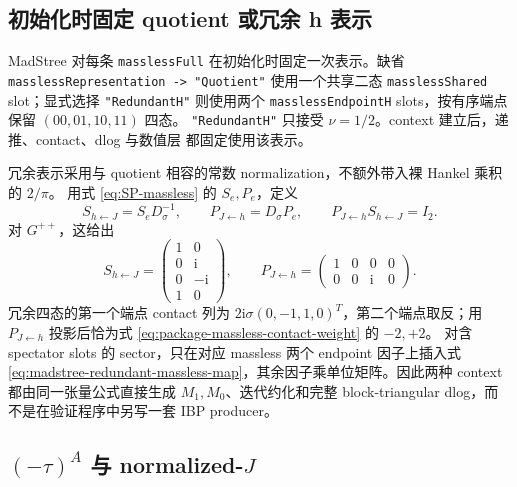 \documentclass[11pt,a4paper]{ctexart}
\newcommand{\ii}{\mathrm i}
\begin{document}
\subsection{初始化时固定 quotient 或冗余 h 表示}

MadStree 对每条 \texttt{masslessFull} 在初始化时固定一次表示。缺省
\texttt{masslessRepresentation -> "Quotient"} 使用一个共享二态
\texttt{masslessShared} slot；显式选择 \texttt{"RedundantH"} 则使用两个
\texttt{masslessEndpointH} slots，按有序端点保留 $(00,01,10,11)$ 四态。
\texttt{"RedundantH"} 只接受 $\nu=1/2$。context 建立后，递推、contact、dlog 与数值层
都固定使用该表示。

冗余表示采用与 quotient 相容的常数 normalization，不额外带入裸 Hankel 乘积的 $2/\pi$。
用式 \eqref{eq:SP-massless} 的 $S_e,P_e$，定义
\begin{equation}
 S_{h\leftarrow J}=S_eD_{\sigma}^{-1},\qquad
 P_{J\leftarrow h}=D_{\sigma}P_e,\qquad
 P_{J\leftarrow h}S_{h\leftarrow J}=I_2.
 \label{eq:madstree-redundant-massless-map}
\end{equation}
对 $G^{++}$，这给出
\begin{equation}
 S_{h\leftarrow J}=\begin{pmatrix}1&0\\0&\ii\\0&-\ii\\1&0\end{pmatrix},
 \qquad
 P_{J\leftarrow h}=\begin{pmatrix}1&0&0&0\\0&0&\ii&0\end{pmatrix}.
\end{equation}
冗余四态的第一个端点 contact 列为
$2\ii\sigma(0,-1,1,0)^T$，第二个端点取反；用
$P_{J\leftarrow h}$ 投影后恰为式 \eqref{eq:package-massless-contact-weight} 的 $-2,+2$。
对含 spectator slots 的 sector，只在对应 massless 两个 endpoint 因子上插入式
\eqref{eq:madstree-redundant-massless-map}，其余因子乘单位矩阵。因此两种 context 都由同一张量公式直接生成
$M_1,M_0$、迭代约化和完整 block-triangular dlog，而不是在验证程序中另写一套 IBP producer。

\subsection{\texorpdfstring{$(-\tau)^A$ 与 normalized-$J$}{(-tau)A 与 normalized-J}}
\end{document}
